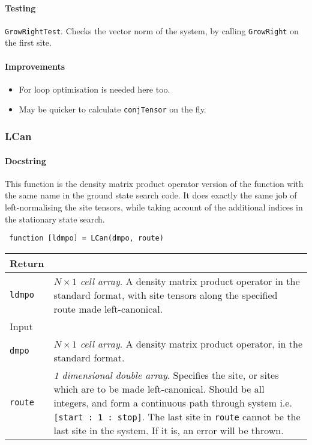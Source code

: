  \paragraph{Testing} \lstinline$GrowRightTest$. Checks the vector norm of the system, by calling \lstinline$GrowRight$ on the first site.
 \paragraph{Improvements}
 \begin{itemize}
 \item For loop optimisation is needed here too.
 \item May be quicker to calculate \lstinline$conjTensor$ on the fly.
 \end{itemize}
 
 \subsubsection{LCan}
 \paragraph{Docstring} This function is the density matrix product operator version of the function with the same name in the ground state search code. It does exactly the same job of left-normalising the site tensors, while taking account of the additional indices in the stationary state search.
 \begin{lstlisting}
 function [ldmpo] = LCan(dmpo, route) \end{lstlisting}
  \begin{longtabu}{X[1,l]X[4,l]}
 \hline
 Return & \\ \hline
 \lstinline$ldmpo$ & \emph{\(N \times 1\) cell array}. A density matrix product operator in the standard format, with site tensors along the specified route made left-canonical. \\ \hline
 Input & \\
 \lstinline$dmpo$ & \emph{\(N \times 1\) cell array}. A density matrix product operator, in the standard format. \\
 \lstinline$route$ & \emph{1 dimensional double array}. Specifies the site, or sites which are to be made left-canonical. Should be all integers, and form a continuous path through system i.e. \lstinline$[start : 1 : stop]$. The last site in \lstinline$route$ cannot be the last site in the system. If it is, an error will be thrown. \\
 \hline
 \end{longtabu} 
